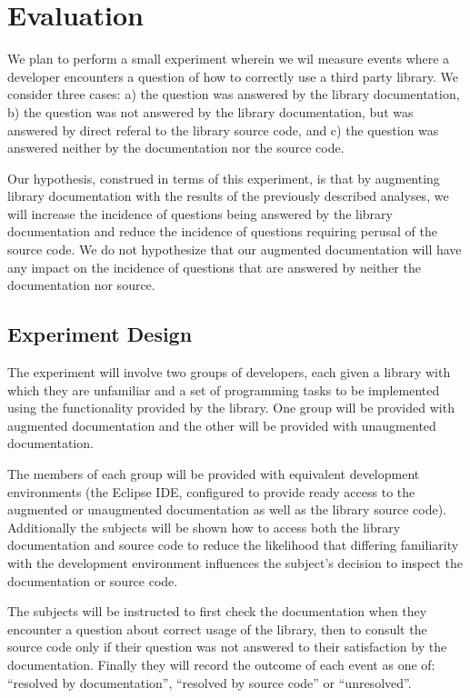 \section{Evaluation}
\label{sec:Evaluation}

We plan to perform a small experiment wherein we wil measure events where a
developer encounters a question of how to correctly use a third party library.
We consider three cases: a) the question was answered by the library
documentation, b) the question was not answered by the library documentation,
but was answered by direct referal to the library source code, and c) the
question was answered neither by the documentation nor the source code.

Our hypothesis, construed in terms of this experiment, is that by augmenting
library documentation with the results of the previously described analyses, we
will increase the incidence of questions being answered by the library
documentation and reduce the incidence of questions requiring perusal of the
source code. We do not hypothesize that our augmented documentation will have
any impact on the incidence of questions that are answered by neither the
documentation nor source.

\subsection{Experiment Design}
The experiment will involve two groups of developers, each given a library with
which they are unfamiliar and a set of programming tasks to be implemented
using the functionality provided by the library. One group will be provided
with augmented documentation and the other will be provided with unaugmented
documentation.

The members of each group will be provided with equivalent development
environments (the Eclipse IDE, configured to provide ready access to the
augmented or unaugmented documentation as well as the library source code).
Additionally the subjects will be shown how to access both the library
documentation and source code to reduce the likelihood that differing
familiarity with the development environment influences the subject's decision
to inspect the documentation or source code.

The subjects will be instructed to first check the documentation when they
encounter a question about correct usage of the library, then to consult the
source code only if their question was not answered to their satisfaction by
the documentation. Finally they will record the outcome of each event as one
of: ``resolved by documentation'', ``resolved by source code'' or
``unresolved''.

